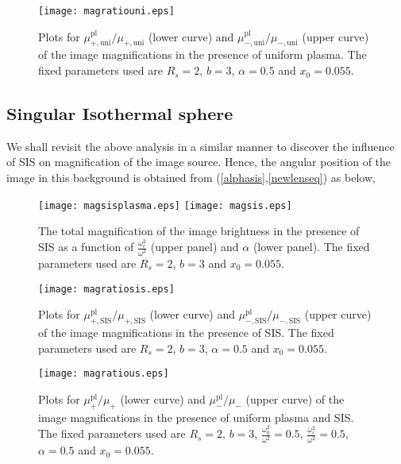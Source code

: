 \documentclass[final,5p,times,twocolumn,unknownkeysallowed]{elsarticle}
\begin{document}
\begin{figure}[h!]
 \begin{center}
   \texttt{[image: magratiouni.eps]}
  \end{center}
\caption{Plots for $\mu^\mathrm{pl}_\mathrm{+,uni}/\mu_\mathrm{+,uni}$ (lower curve) and $\mu^\mathrm{pl}_\mathrm{-,uni}/\mu_\mathrm{-,uni}$ (upper curve)
of the image magnifications in the presence of uniform plasma. The fixed parameters used are $R_s=2$, $b=3$, $\alpha=0.5$
and $x_0=0.055$.}\label{magratiouni}
\end{figure}

\subsection{$\mathbf{Singular}$ $\mathbf{Isothermal}$ $\mathbf{sphere}$}
We shall revisit the above analysis in a similar manner to discover the influence of SIS on magnification of the image source.
Hence, the angular position of the image in this background is obtained from (\ref{alphasis},\ref{newlenseq})
as below,

\begin{figure}[h!]
 \begin{center}
   \texttt{[image: magsisplasma.eps]}
   \texttt{[image: magsis.eps]}
  \end{center}
\caption{The total magnification of the image brightness in the presence of SIS as a function of $\frac{\omega^2_c}{\omega^2}$
(upper panel) and $\alpha$ (lower panel). The fixed parameters
used are $R_s=2$, $b=3$ and $x_0=0.055$.}\label{magsis}
\end{figure}


\begin{figure}[h!]
 \begin{center}
   \texttt{[image: magratiosis.eps]}
  \end{center}
\caption{Plots for $\mu^\mathrm{pl}_\mathrm{+,SIS}/\mu_\mathrm{+,SIS}$ (lower curve) and $\mu^\mathrm{pl}_\mathrm{-,SIS}/\mu_\mathrm{-,SIS}$ (upper curve)
of the image magnifications in the presence of SIS. The fixed parameters used are $R_s=2$,
$b=3$, $\alpha=0.5$ and $x_0=0.055$.}\label{magsisplasma}
\end{figure}

\begin{figure}[h!]
 \begin{center}
   \texttt{[image: magratious.eps]}
  \end{center}
\caption{ Plots for $\mu^\mathrm{pl}_\mathrm{+}/\mu_\mathrm{+}$ (lower curve) and $\mu^\mathrm{pl}_\mathrm{-}/\mu_\mathrm{-}$ (upper curve)
of the image magnifications in the presence of uniform plasma and SIS. The fixed parameters used are $R_s=2$, $b=3$, $\frac{\omega^2_0}{\omega^2}=0.5$,
$\frac{\omega^2_c}{\omega^2}=0.5$, $\alpha=0.5$ and $x_0=0.055$.}\label{magus}
\end{figure}
\end{document}
